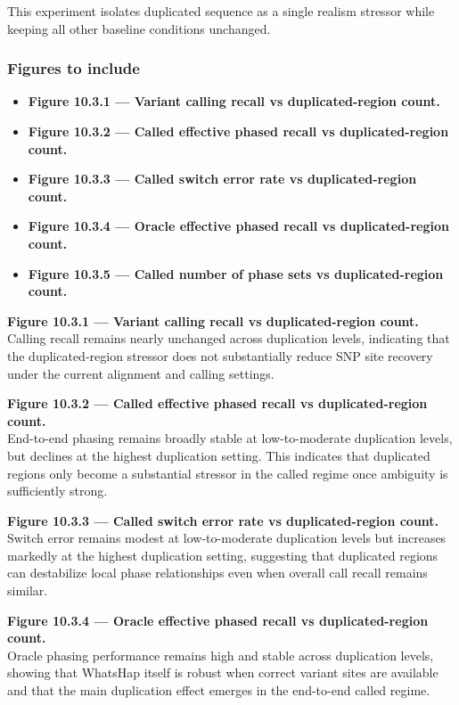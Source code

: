 \documentclass[
]{article}
\providecommand{\tightlist}{%
  \setlength{\itemsep}{0pt}\setlength{\parskip}{0pt}}
\begin{document}
This experiment isolates duplicated sequence as a single realism
stressor while keeping all other baseline conditions unchanged.

\subsubsection{Figures to include}\label{figures-to-include-1}

\begin{itemize}
\tightlist
\item
  \textbf{Figure 10.3.1 --- Variant calling recall vs duplicated-region
  count.}
\item
  \textbf{Figure 10.3.2 --- Called effective phased recall vs
  duplicated-region count.}
\item
  \textbf{Figure 10.3.3 --- Called switch error rate vs
  duplicated-region count.}
\item
  \textbf{Figure 10.3.4 --- Oracle effective phased recall vs
  duplicated-region count.}
\item
  \textbf{Figure 10.3.5 --- Called number of phase sets vs
  duplicated-region count.}
\end{itemize}

\textbf{Figure 10.3.1 --- Variant calling recall vs duplicated-region
count.}\\
Calling recall remains nearly unchanged across duplication levels,
indicating that the duplicated-region stressor does not substantially
reduce SNP site recovery under the current alignment and calling
settings.

\textbf{Figure 10.3.2 --- Called effective phased recall vs
duplicated-region count.}\\
End-to-end phasing remains broadly stable at low-to-moderate duplication
levels, but declines at the highest duplication setting. This indicates
that duplicated regions only become a substantial stressor in the called
regime once ambiguity is sufficiently strong.

\textbf{Figure 10.3.3 --- Called switch error rate vs duplicated-region
count.}\\
Switch error remains modest at low-to-moderate duplication levels but
increases markedly at the highest duplication setting, suggesting that
duplicated regions can destabilize local phase relationships even when
overall call recall remains similar.

\textbf{Figure 10.3.4 --- Oracle effective phased recall vs
duplicated-region count.}\\
Oracle phasing performance remains high and stable across duplication
levels, showing that WhatsHap itself is robust when correct variant
sites are available and that the main duplication effect emerges in the
end-to-end called regime.
\end{document}
